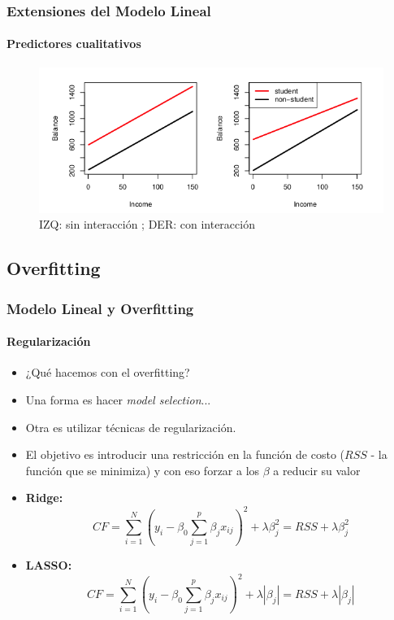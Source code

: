 \documentclass{beamer}
\begin{document}
\begin{frame}
\frametitle{Extensiones del Modelo Lineal}
\framesubtitle{Predictores cualitativos}
\begin{figure}[h]
	\includegraphics[width=1.\linewidth, height=0.5\textheight]{./img/graph01}
	\caption{IZQ: sin interacción ; DER: con interacción \cite{hastie02}}
\end{figure}
\end{frame}


\subsection{Overfitting}
\begin{frame}
	\frametitle{Modelo Lineal y Overfitting}
	\framesubtitle{Regularización}
	\begin{itemize}
		\item{¿Qué hacemos con el overfitting?}
		\item{Una forma es hacer \emph{model selection}...}
		\item{Otra es utilizar técnicas de regularización.}
		\item{El objetivo es introducir una restricción en la función de costo ($RSS$ - la función que se minimiza) y con eso forzar a los $\beta$} a reducir su valor \\
		\item{\textbf{Ridge:} 
			\begin{equation}
			CF = \sum_{i=1}^N(y_{i}-\beta_{0}\sum_{j=1}^p\beta_{j}x_{ij})^2 + \lambda\beta_{j}^2 = RSS + \lambda\beta_{j}^2
			\end{equation}}	
		\item{\textbf{LASSO:} 
			\begin{equation}
			CF = \sum_{i=1}^N(y_{i}-\beta_{0}\sum_{j=1}^p\beta_{j}x_{ij})^2 + \lambda|\beta_{j}| = RSS + \lambda|\beta_{j}|
			\end{equation}}	
	\end{itemize}
\end{frame}
\end{document}
